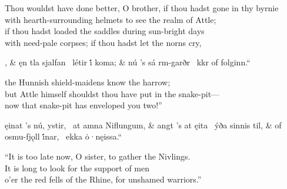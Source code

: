 \bvb Thou wouldst have done better, O brother, if thou hadst gone in thy byrnie \\
with hearth-surrounding helmets to see the realm of Attle; \\
if thou hadst loaded the saddles during sun-bright days \\
with need-pale corpses; if thou hadst let the norns cry,\evb\evg


\bvg\bva{}%
, &
ęn tla sjalfan \hld\ létir i̇́  koma; &
nú ’s sá rm-garðr \hld\ kkr of folginn.“\eva

\bvb {[and]} the Hunnish shield-maidens know the harrow; \\
but Attle himself shouldst thou have put in the snake-pit--- \\
now that snake-pit has enveloped you two!”\evb\evg


\bvg\bva{}%
%
ęinat ’s nú, ystir, \hld\ at amna Niflungum, &
angt ’s at ęita \hld\ ýða sinnis til, &
of osmu-fjǫll i̇́nar, \hld\ ekka ȯ·nęissa.“\eva

\bvb{}%
“It is too late now, O sister, to gather the Nivlings. \\
It is long to look for the support of men \\
o’er the red fells of the Rhine, for unshamed  warriors.”\evb\evg


